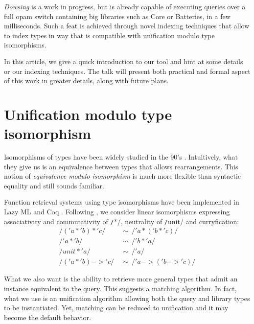 \documentclass [a4paper,11pt] {scrartcl}
\newcommand {\dowsing} {\textit {Dowsing}\xspace}
\begin{document}
\dowsing is a work in progress, but is already capable of
executing queries over a full opam switch
containing big libraries such as Core or Batteries, in a few milliseconds.
Such a feat is achieved through novel indexing techniques that allow
to index types in way that is compatible with unification modulo type
isomorphisms.

In this article, we give a quick introduction to our tool and hint at some
details or our indexing techniques. The talk will present both practical
and formal aspect of this work in greater details, along with
future plans.



\section {Unification modulo type isomorphism}

Isomorphisms of types have been widely studied in the 90's \cite {dicosmo}. Intuitively, what they give us is an equivalence between types that allows rearrangements. This notion of \emph {equivalence modulo isomorphism} is much more flexible than syntactic equality and still sounds familiar.

Function retrieval systems using type isomorphisms have been implemented in Lazy ML \cite {rittri} and Coq \cite {delahaye}. Following \cite {rittri}, we consider linear isomorphisms expressing associativity and commutativity of \texttt/*/, neutrality of \texttt/unit/ and curryfication:
\begin {align*}
  \texttt/('a * 'b) * 'c/ &\ \sim\ \texttt/'a * ('b * 'c)/ \\
  \texttt/'a * 'b/ &\ \sim\ \texttt/'b * 'a/ \\
  \texttt/unit * 'a/ &\ \sim\ \texttt/'a/ \\
  \texttt/('a * 'b) -> 'c/ &\ \sim\ \texttt/'a -> ('b -> 'c)/
\end {align*}

What we also want is the ability to retrieve more general types that admit an instance equivalent to the query. This suggests a matching algorithm. In fact, what we use is an unification algorithm \cite {boudet} allowing both the query and library types to be instantiated. Yet, matching can be reduced to unification and it may become the default behavior.
\end{document}
